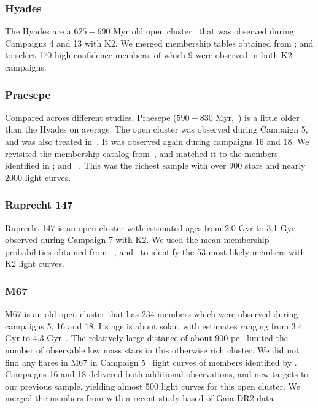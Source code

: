 \documentclass{aa}
\begin{document}
\subsubsection{Hyades}
The Hyades are a $625-690$ Myr old open cluster~\citep{perryman1998,salaris_age_2004, gossage2018, gaia_dr2_2018_hrd} that was observed during Campaigns 4 and 13 with K2.  We merged membership tables obtained from \citet{douglas_praesepe_hyades_2014, reino_hyades_2018}; and \citet{gaia_dr2_2018_hrd} to select 170 high confidence members, of which 9 were observed in both K2 campaigns. 
\subsubsection{Praesepe}
Compared across different studies, Praesepe ($590-830$ Myr,~\citealt{salaris_age_2004, boudreault_astrometric_2012, scholz2015, yen2018, gossage2018, bossini2019}) is a little older than the Hyades on average. The open cluster was observed during Campaign 5, and was also treated in~. It was observed again during campaigns 16 and 18. We revisited the membership catalog from~\citet{douglas_praesepe_hyades_2014}, and matched it to the members identified in \citet{douglas_poking_2017, rebull_praesepe_2017,cantat_gaudin_2018}; and ~\citet{gaia_dr2_2018_hrd}. This was the richest sample with over 900 stars and nearly 2000 light curves.
\subsubsection{Ruprecht 147}
Ruprecht 147 is an open cluster with estimated ages from 2.0 Gyr to 3.1 Gyr~\citep{curtis2013,scholz2015,gaia_dr2_2018_hrd,torres2018} observed during Campaign 7 with K2. We used the mean membership probabilities obtained from ~\citet{curtis2013, cantat_gaudin_2018, olivares_ngc6774_2019}, and~\citet{gaia_dr2_2018_hrd} to identify the 53 most likely members with K2 light curves.
\subsubsection{M67}
M67 is an old open cluster that has 234 members which were observed during campaigns 5, 16 and 18. Its age is about solar, with estimates ranging from 3.4 Gyr to 4.3 Gyr~\citep{salaris_age_2004, onehag2011, dias_fitting_2012, scholz2015, barnes_rotation_2016, bossini2019}. The relatively large distance of about 900 pc~\citep{dias_fitting_2012} limited the number of observable low mass stars in this otherwise rich cluster. We did not find any flares in M67 in Campaign 5~ light curves of members identified by \citet{gonzalez_m67mem_2016}. Campaigns 16 and 18 delivered both additional observations, and new targets to our previous sample, yielding almost 500 light curves for this open cluster. We merged the members from \citet{gonzalez_m67mem_2016} with a recent study based of Gaia DR2 data~\citep{gao_m67mem_2018}.
\end{document}
